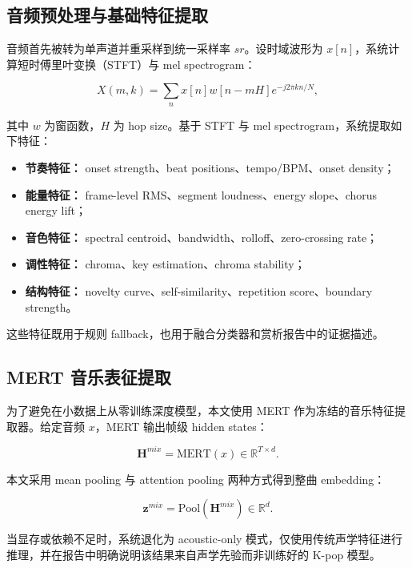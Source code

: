 \documentclass[UTF8,zihao=-4]{ctexart}
\begin{document}
\subsection{音频预处理与基础特征提取}

音频首先被转为单声道并重采样到统一采样率 $sr$。设时域波形为 $x[n]$，系统计算短时傅里叶变换（STFT）与 mel spectrogram：

\begin{equation}
X(m,k)=\sum_n x[n]w[n-mH]e^{-j2\pi kn/N},
\end{equation}

其中 $w$ 为窗函数，$H$ 为 hop size。基于 STFT 与 mel spectrogram，系统提取如下特征：

\begin{itemize}[leftmargin=2em]
    \item \textbf{节奏特征：} onset strength、beat positions、tempo/BPM、onset density；
    \item \textbf{能量特征：} frame-level RMS、segment loudness、energy slope、chorus energy lift；
    \item \textbf{音色特征：} spectral centroid、bandwidth、rolloff、zero-crossing rate；
    \item \textbf{调性特征：} chroma、key estimation、chroma stability；
    \item \textbf{结构特征：} novelty curve、self-similarity、repetition score、boundary strength。
\end{itemize}

这些特征既用于规则 fallback，也用于融合分类器和赏析报告中的证据描述。

\subsection{MERT 音乐表征提取}

为了避免在小数据上从零训练深度模型，本文使用 MERT 作为冻结的音乐特征提取器。给定音频 $x$，MERT 输出帧级 hidden states：

\begin{equation}
\bm{H}^{mix} = \mathrm{MERT}(x) \in \mathbb{R}^{T \times d}.
\end{equation}

本文采用 mean pooling 与 attention pooling 两种方式得到整曲 embedding：

\begin{equation}
\bm{z}^{mix}=\mathrm{Pool}(\bm{H}^{mix}) \in \mathbb{R}^{d}.
\end{equation}

当显存或依赖不足时，系统退化为 acoustic-only 模式，仅使用传统声学特征进行推理，并在报告中明确说明该结果来自声学先验而非训练好的 K-pop 模型。
\end{document}
